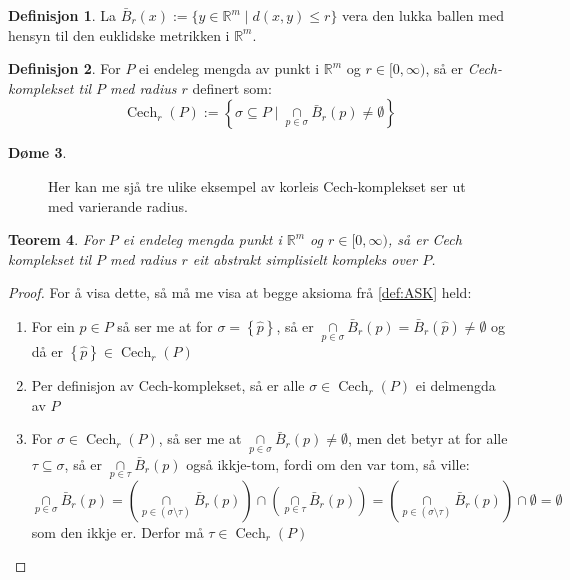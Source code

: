 \documentclass[a4paper, titlepage, 12pt, norsk]{article}
\theoremstyle{plain}
\newtheorem{theorem}{Teorem}[section]
\theoremstyle{definition}
\newtheorem{definition}[theorem]{Definisjon}
\newtheorem{example}[theorem]{Døme}
\newcommand{\Rb}{\mathbb{R}}
\DeclareMathOperator{\Cech}{Cech}
\newcommand{\intersect}{ \mathop{\cap}\limits } %
\newcommand{\set}[1]{ \left \{ #1 \right \} } %
\begin{document}
\begin{definition}
	La $\bar{B}_r(x):=\{y\in\Rb^m \mid d(x, y)\leq r\}$ vera den lukka ballen med hensyn til den euklidske metrikken i $\Rb^m$.
\end{definition}

\begin{definition}
	For $P$ ei endeleg mengda av punkt i $\Rb^m$ og $r\in[0,\infty)$, så er \emph{Cech-komplekset til $P$ med radius $r$} definert som:
	\[
		\Cech_r(P):=\left\{\sigma\subseteq P \mid \intersect_{p\in\sigma}\bar{B}_r(p)\neq\emptyset\right\}
	\]
\end{definition}

\begin{example}
	\phantom{abcd}
	\begin{figure}[htbp]
		\begin{center}
			
		\end{center}
		\caption{Her kan me sjå tre ulike eksempel av korleis Cech-komplekset ser ut med varierande radius.}
	\end{figure}
\end{example}

\begin{theorem} \label{thm:CASK}
	For $P$ ei endeleg mengda punkt i $\Rb^m$ og $r\in[0,\infty)$, så er Cech komplekset til $P$ med radius $r$ eit abstrakt simplisielt kompleks over $P$.
\end{theorem}

\begin{proof}
	For å visa dette, så må me visa at begge aksioma frå \autoref{def:ASK} held:
	\begin{enumerate}
		\item{ For ein \( \hat{p} \in P \) så ser me at for \( \sigma = \set{\hat{p}} \), så er \( \intersect_{p\in\sigma}\bar{B}_r(p)=\bar{B}_r(\hat{p})\neq\emptyset \) og då er \( \set{\hat{p}} \in \Cech_r(P) \) }
		\item{ Per definisjon av Cech-komplekset, så er alle \( \sigma \in \Cech_r(P) \) ei delmengda av \( P \) }
		\item{ For \( \sigma \in \Cech_r(P) \), så ser me at \( \intersect_{p\in\sigma} \bar{B}_r(p) \neq \emptyset \), men det betyr at for alle \( \tau \subseteq \sigma \), så er \( \intersect_{p\in\tau} \bar{B}_r(p) \) også ikkje-tom, fordi om den var tom, så ville: 
			\[ 
				\intersect_{p\in\sigma} \bar{B}_r(p) = \left( \intersect_{p\in(\sigma\setminus\tau)} \bar{B}_r(p) \right) \intersect \left( \intersect_{p\in\tau} \bar{B}_r(p) \right) = \left( \intersect_{p\in(\sigma\setminus\tau)} \bar{B}_r(p) \right) \intersect \emptyset = \emptyset 
			\] 
			som den ikkje er. Derfor må \( \tau \in \Cech_r(P) \) }
	\end{enumerate}
\end{proof}
\end{document}
